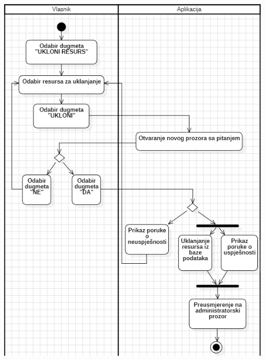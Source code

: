\documentclass{scrreprt}
\begin{document}
\begin{center}
	\includegraphics[width=14cm]{./img/12.png}
\end{center}

\pagebreak

\end{document}
